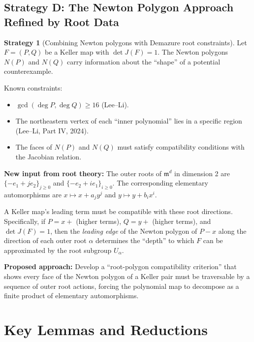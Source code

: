 \documentclass[12pt,a4paper]{article}
\theoremstyle{definition}
\newtheorem{strategy}[theorem]{Strategy}
\newcommand{\pp}{\mathfrak{m}}
\begin{document}
\subsection{Strategy D: The Newton Polygon Approach Refined by Root Data}

\begin{strategy}[Combining Newton polygons with Demazure root constraints]
Let $F = (P,Q)$ be a Keller map with $\det J(F) = 1$. The Newton polygons $N(P)$ and $N(Q)$
carry information about the ``shape'' of a potential counterexample.

Known constraints:
\begin{itemize}
  \item $\gcd(\deg P, \deg Q) \geq 16$ (Lee--Li).
  \item The northeastern vertex of each ``inner polynomial'' lies in a specific region
    (Lee--Li, Part IV, 2024).
  \item The faces of $N(P)$ and $N(Q)$ must satisfy compatibility conditions with the
    Jacobian relation.
\end{itemize}

\textbf{New input from root theory:} The outer roots of $\pp^d$ in dimension 2 are
$\{-e_1 + je_2\}_{j \geq 0}$ and $\{-e_2 + ie_1\}_{i \geq 0}$. The corresponding
elementary automorphisms are $x \mapsto x + a_j y^j$ and $y \mapsto y + b_i x^i$.

A Keller map's leading term must be compatible with these root directions. Specifically,
if $P = x + $ (higher terms), $Q = y + $ (higher terms), and $\det J(F) = 1$, then the
\emph{leading edge} of the Newton polygon of $P - x$ along the direction of each outer root
$\alpha$ determines the ``depth'' to which $F$ can be approximated by the root subgroup
$U_\alpha$.

\textbf{Proposed approach:} Develop a ``root-polygon compatibility criterion'' that
shows every face of the Newton polygon of a Keller pair must be traversable by a
sequence of outer root actions, forcing the polynomial map to decompose as a finite product
of elementary automorphisms.
\end{strategy}

\section{Key Lemmas and Reductions}
\end{document}
